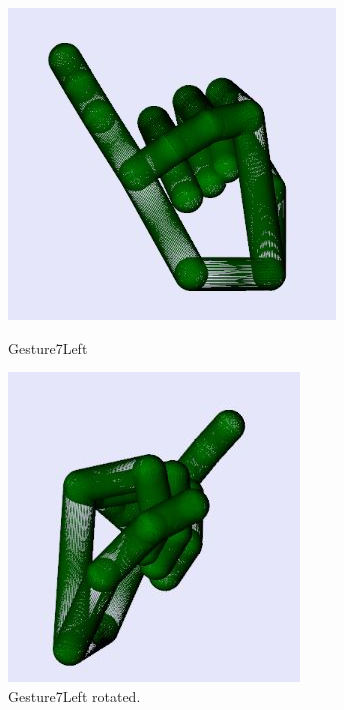 \begin{figure}[H]
    \centering
    \begin{minipage}{0.5\textwidth}
        \centering
        \includegraphics[scale=.75]{Figures/gesture7Left.JPG} 
        \caption[Gesture7Left]{Gesture7Left}
		\label{fig:Gesture7Left}
    \end{minipage}\hfill
    \begin{minipage}{0.5\textwidth}
        \centering
        \includegraphics[scale=.75]{Figures/gesture7Left_rotated.JPG}
        \caption[Gesture7Left Rotated]{Gesture7Left rotated.}
        \label{fig:Gesture7Left_rotated}
    \end{minipage}
\end{figure}

